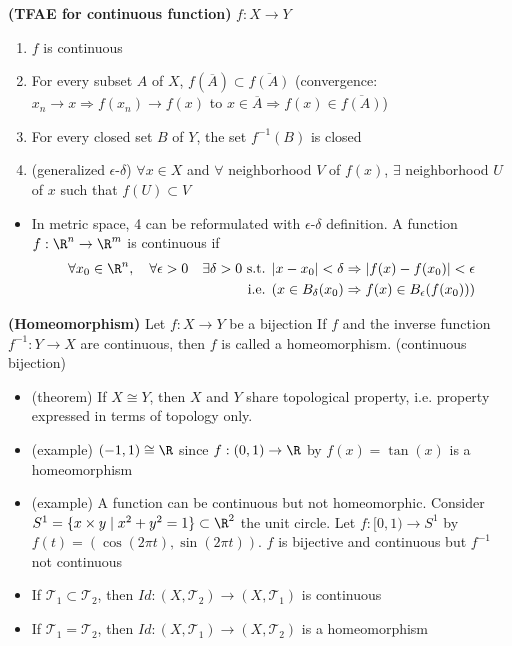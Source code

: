 \documentclass[10.5pt]{article}
\newcommand{\calT}{\mathcal{T}}
\begin{document}
\begin{theorem*}
    \textbf{(TFAE for continuous function)} $f:X\to Y$
    \begin{enumerate}
        \item $f$ is continuous
        \item For every subset $A$ of $X$, $f(\overline{A}) \subset \overline{f(A)}$ (convergence: $x_n \to x \Rightarrow f(x_n)\to f(x)$ to $x\in \overline{A} \Rightarrow f(x)\in \overline{f(A)}$)
        \item For every closed set $B$ of $Y$, the set $f^{-1}(B)$ is closed
        \item (generalized $\epsilon$-$\delta$) $\forall x\in X$ and $\forall$ neighborhood $V$ of $f(x)$, $\exists$ neighborhood $U$ of $x$ such that $f(U)\subset V$
    \end{enumerate}
    \begin{itemize}
        \item In metric space, 4 can be reformulated with $\epsilon$-$\delta$ definition. A function $f:\R^n \to \R^m$ is continuous if 
        \begin{align*}
            \forall x_0 \in \R^n, \quad \forall \epsilon > 0 \quad \exists \delta > 0 \text{ s.t. } & |x-x_0|<\delta \Rightarrow |f(x)-f(x_0)|<\epsilon \\ 
            \text{ i.e. } & (x\in B_{\delta}(x_0) \Rightarrow f(x)\in B_{\epsilon}(f(x_0)))
        \end{align*}
    \end{itemize}
\end{theorem*}

\begin{defn*}
    \textbf{(Homeomorphism)} Let $f:X\to Y$ be a bijection If $f$ and the inverse function $f^{-1}:Y\to X$ are continuous, then $f$ is called a homeomorphism. (continuous bijection)
    \begin{itemize}
        \item (theorem) If $X\cong Y$, then $X$ and $Y$ share topological property, i.e. property expressed in terms of topology only.
        \item (example) $(-1,1) \cong \R$ since $f: (0,1) \to \R$ by $f(x) = \tan(x)$ is a homeomorphism
        \item (example) A function can be continuous but not homeomorphic. Consider $S^1 = \{x\times y\mid x^2 + y^2 = 1\}\subset \R^2$ the unit circle. Let $f:[0,1) \to S^1$ by $f(t) = (\cos(2\pi t), \sin(2\pi t))$. $f$ is bijective and continuous but $f^{-1}$ not continuous
        \item If $\calT_1 \subset \calT_2$, then $Id: (X,\calT_2) \to (X,\calT_1)$ is continuous
        \item If $\calT_1 = \calT_2$, then $Id: (X, \calT_1) \to (X,\calT_2)$ is a homeomorphism
    \end{itemize}
\end{defn*}
\end{document}
